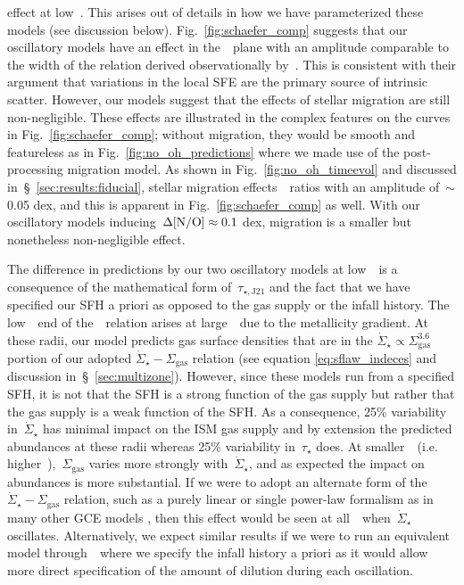 \documentclass[ms.tex]{subfiles}
\begin{document}
effect at low~\oh.
This arises out of details in how we have parameterized these models (see
discussion below).
Fig.~\ref{fig:schaefer_comp} suggests that our oscillatory models have an
effect in the~\ohno~plane with an amplitude comparable to the width of the
relation derived observationally by~\citet{Schaefer2020}.
This is consistent with their argument that variations in the local SFE are
the primary source of intrinsic scatter.
However, our models suggest that the effects of stellar migration are still
non-negligible.
These effects are illustrated in the complex features on the curves in
Fig.~\ref{fig:schaefer_comp}; without migration, they would be smooth and
featureless as in Fig.~\ref{fig:no_oh_predictions} where we made use of the
post-processing migration model.
As shown in Fig.~\ref{fig:no_oh_timeevol} and discussed
in~\S~\ref{sec:results:fiducial}, stellar migration effects~\no~ratios with
an amplitude of~$\sim$0.05 dex, and this is apparent in
Fig.~\ref{fig:schaefer_comp} as well.
With our oscillatory models inducing~$\Delta\text{[N/O]} \approx 0.1$ dex, migration is
a smaller but nonetheless non-negligible effect.
\par
The difference in predictions by our two oscillatory models at low~\oh~is a
consequence of the mathematical form of~$\tau_{\star,\text{J21}}$ and the fact
that we have specified our SFH a priori as opposed to the gas supply or the
infall history.
The low~\oh~end of the~\ohno~relation arises at large~\rgal~due to the
metallicity gradient.
At these radii, our model predicts gas surface densities that are in the
$\dot{\Sigma}_\star \propto \Sigma_\text{gas}^{3.6}$ portion of our adopted
$\dot{\Sigma}_\star - \Sigma_\text{gas}$ relation (see equation
\ref{eq:sflaw_indeces} and discussion in~\S~\ref{sec:multizone}).
However, since these models run from a specified SFH, it is not that the SFH is
a strong function of the gas supply but rather that the gas supply is a weak
function of the SFH.
As a consequence, 25\% variability in~$\dot{\Sigma}_\star$ has minimal impact
on the ISM gas supply and by extension the predicted abundances at these radii
whereas 25\% variability in~$\tau_\star$ does.
At smaller~\rgal~(i.e. higher~\oh),~$\Sigma_\text{gas}$ varies more strongly
with~$\dot{\Sigma}_\star$, and as expected the impact on abundances is more
substantial.
If we were to adopt an alternate form of the
$\dot{\Sigma}_\star - \Sigma_\text{gas}$ relation, such as a purely linear or
single power-law formalism as in many other GCE models
\citep[e.g.][]{Spitoni2019, Spitoni2021, Grisoni2021}, then this effect would
be seen at all~\oh~when~$\dot{\Sigma}_\star$ oscillates.
Alternatively, we expect similar results if we were to run an equivalent model
through~\vice~where we specify the infall history a priori as it would allow
more direct specification of the amount of dilution during each oscillation.
\end{document}
